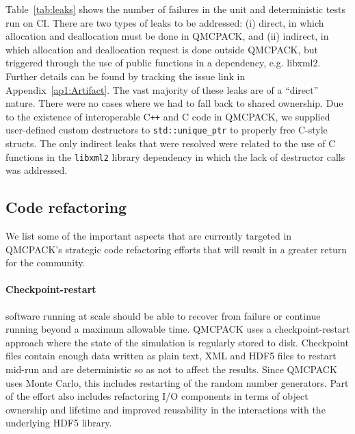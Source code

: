Table~\ref{tab:leaks} shows the number of failures in the unit and deterministic tests run on CI.
There are two types of leaks to be addressed:
(i) direct, in which allocation and deallocation must be done in QMCPACK, and 
(ii) indirect, in which allocation and deallocation request is done outside QMCPACK, but triggered through the use of public functions in a dependency, e.g. libxml2.
Further details can be found by tracking the issue link in Appendix~\ref{ap1:Artifact}.
The vast majority of these leaks are of a ``direct'' nature.
There were no cases where we had to fall back to shared ownership.
Due to the existence of interoperable C\texttt{++} and C code in QMCPACK, we supplied user-defined custom destructors to \texttt{std::unique\_ptr} to properly free C-style structs.
The only indirect leaks that were resolved were related to the use of C functions in the \texttt{libxml2} library dependency in which the lack of destructor calls was addressed.

\subsection{Code refactoring}

We list some of the important aspects that are currently targeted in QMCPACK's strategic code refactoring efforts that will result in a greater return for the community.

\paragraph{Checkpoint-restart} software running at scale should be able to recover from failure or continue running beyond a maximum allowable time.
QMCPACK uses a checkpoint-restart approach where the state of the simulation is regularly stored to disk. Checkpoint files contain enough data written as plain text, XML and HDF5 files to restart mid-run and are deterministic so as not to affect the results.
Since QMCPACK uses Monte Carlo, this includes restarting of the random number generators.
Part of the effort also includes refactoring I/O components in terms of object ownership and lifetime and improved reusability in the interactions with the underlying HDF5 library.

